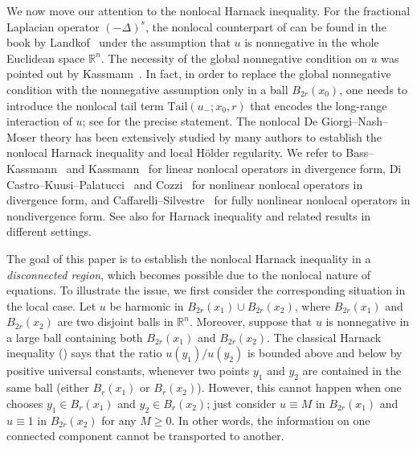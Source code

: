 \documentclass[11pt]{amsart}
\theoremstyle{plain}
\theoremstyle{definition}
\numberwithin{equation}{section}
\begin{document}
We now move our attention to the nonlocal Harnack inequality. For the fractional Laplacian operator $(-\Delta)^s$, the nonlocal counterpart of  can be found in the book by Landkof~\cite{Lan72} under the assumption that $u$ is nonnegative in the whole Euclidean space $\mathbb{R}^n$. The necessity of the global nonnegative condition on $u$ was pointed out by Kassmann~\cite{Kas07a}. In fact, in order to replace the global nonnegative condition with the nonnegative assumption only in a ball $B_{2r}(x_0)$, one needs to introduce the nonlocal tail term $\mathrm{Tail}(u_-; x_0, r)$ that encodes the long-range interaction of $u$; see  for the precise statement. The nonlocal De Giorgi--Nash--Moser theory has been extensively studied by many authors to establish the nonlocal Harnack inequality and local H\"older regularity. We refer to Bass--Kassmann~\cite{BK05a, BK05b} and Kassmann~\cite{Kas09, Kas11} for linear nonlocal operators in divergence form, Di Castro--Kuusi--Palatucci~\cite{DCKP14, DCKP16} and Cozzi~\cite{Coz17} for nonlinear nonlocal operators in divergence form, and Caffarelli--Silvestre~\cite{CS09, CS11} for fully nonlinear nonlocal operators in nondivergence form. See also \cite{BKO23, CKW23, IMS16, KW24a, KLL25, Lin16} for Harnack inequality and related results in different settings.\newline


The goal of this paper is to establish the nonlocal Harnack inequality in a \emph{disconnected region}, which becomes possible due to the nonlocal nature of equations. To illustrate the issue, we first consider the corresponding situation in the local case. Let $u$ be harmonic in $B_{2r}(x_1) \cup B_{2r}(x_2)$, where $B_{2r}(x_1)$ and $B_{2r}(x_2)$ are two disjoint balls in $\mathbb{R}^n$. Moreover, suppose that $u$ is nonnegative in a large ball containing both  $B_{2r}(x_1)$ and $B_{2r}(x_2)$. The classical Harnack inequality () says that the ratio $u(y_1)/u(y_2)$ is bounded above and below by positive universal constants, whenever two points $y_1$ and $y_2$ are contained in the same ball (either $B_{r}(x_1)$ or $B_{r}(x_2)$). However, this cannot happen when one chooses $y_1 \in B_{r}(x_1)$ and $y_2 \in B_{r}(x_2)$; just consider $u \equiv M$ in $B_{2r}(x_1)$ and $u \equiv 1$ in $B_{2r}(x_2)$ for any $M \geq 0$. In other words, the information on one connected component cannot be transported to another.
\end{document}
